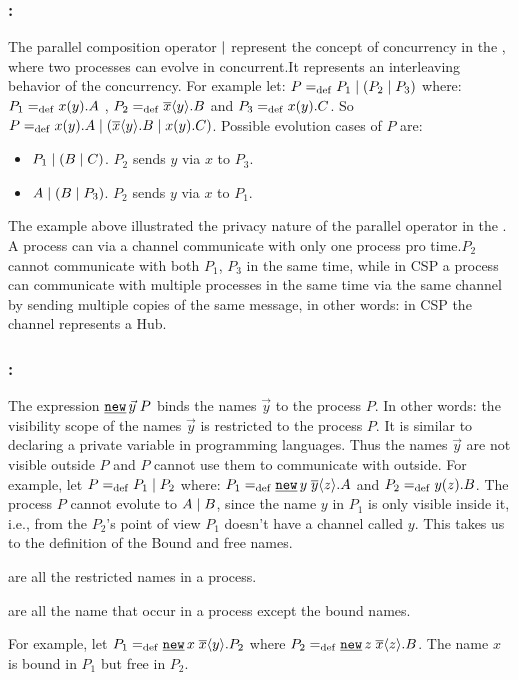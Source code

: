\subsubsection{:}
The parallel composition operator $\mid$ represent the concept of concurrency in the \picalc{}, where two processes can evolve in concurrent.It represents an interleaving behavior of the concurrency.
For example let:  $P=_{\mathrm{def}}P_1 \mid (P_2 \mid P_3)$ where: $P_1=_{\mathrm{def}}x(y).A$ , $P_2=_{\mathrm{def}}\overline{x}\langle y\rangle.B$ and $P_3=_{\mathrm{def}}x(y).C$. So $P=_{\mathrm{def}}x(y).A \mid (\overline{x}\langle y\rangle.B \mid x(y).C)$.
Possible evolution cases of $P$ are:
\begin{itemize}
\item $P_1 \mid (B \mid C)$. $P_2$ sends $y$ via $x$ to $P_3$.
\item $A \mid (B \mid P_3)$. $P_2$ sends $y$ via $x$ to $P_1$.
\end{itemize}

The example above illustrated the privacy nature of the parallel operator in the \picalc{}. A process can via a channel communicate with only one process pro time.$P_2$ cannot communicate with both $P_1$, $P_3$ in the same time, while in \gls{CSP} a process can communicate with multiple processes in the same time via the same channel by sending multiple copies of the same message, in other words: in CSP the channel represents a Hub.


\subsubsection{:}

The expression $\procres{\vec{y}}{P}$ binds the names $\vec{y}$ to the process $P$. In other words: the visibility scope of the  names $\vec{y}$ is restricted to the process $P$. It is similar to declaring a private variable in programming languages. Thus the names $\vec{y}$ are not visible outside $P$ and $P$ cannot use them to communicate with outside. For example, let $P=_{\mathrm{def}}P_1 \mid P_2$ where: $P_1\define\procres{y}{\out{y}{z}.A}$ and $P_2=_{\mathrm{def}}y(z).B$. The process $P$ cannot evolute to $A \mid B$, since the name $y$ in $P_1$ is only visible inside it, i.e., from the $P_2$'s point of view $P_1$ doesn't have a channel called $y$. This takes us to the definition of the Bound and free names.

\begin{definition}
\label{def_bound_names}
 are all the restricted names in a process.
\end{definition}
\begin{definition}
\label{def_free_names}
 are all the name that occur in a process except the bound names.
\end{definition}

For example, let $P_1\define\procres{x}{\out{x}{y}.P_2}$ where $P_2\define\procres{z}{\out{x}{z}.B}$. The name $x$ is bound in $P_1$ but free in $P_2$.

